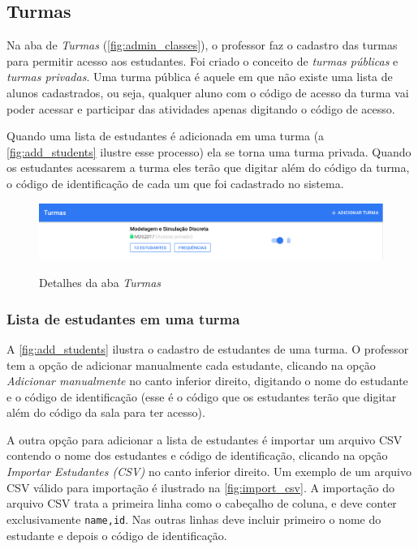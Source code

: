 \subsection{Turmas}
\label{subsection:turmas}

Na aba de \textit{Turmas} (\autoref{fig:admin_classes}), o professor faz o cadastro das turmas
para permitir acesso aos estudantes. Foi criado o conceito de \textit{turmas públicas}
e \textit{turmas privadas}. Uma turma pública é aquele em que não existe uma
lista de alunos cadastrados, ou seja, qualquer aluno com o código de acesso da turma
vai poder acessar e participar das atividades apenas digitando o código de acesso.

Quando uma lista de estudantes é adicionada em uma turma (a \autoref{fig:add_students} ilustre esse processo) ela se
torna uma turma privada. Quando os estudantes acessarem a turma eles terão que
digitar além do código da turma, o código de identificação de cada um que foi cadastrado no sistema.

\begin{figure}[ht]
  \centering
  \caption{Detalhes da aba \textit{Turmas}}
  \includegraphics[scale=.42]{imagens/telas/admin_classes}
  \doautor
  \label{fig:admin_classes}
\end{figure}

\subsubsection{Lista de estudantes em uma turma}

A \autoref{fig:add_students} ilustra o cadastro de estudantes de uma turma.
O professor tem a opção de adicionar manualmente cada estudante, clicando
na opção \textit{Adicionar manualmente} no canto inferior direito, digitando
o nome do estudante e o código de identificação (esse é o código que os estudantes
terão que digitar além do código da sala para ter acesso).

A outra opção para adicionar a lista de estudantes é importar um arquivo CSV
contendo o nome dos estudantes e código de identificação, clicando
na opção \textit{Importar Estudantes (CSV)} no canto inferior direito. Um exemplo de um
arquivo CSV válido para importação é ilustrado na \autoref{fig:import_csv}.
A importação do arquivo CSV trata a primeira linha como o cabeçalho de coluna,
e deve conter exclusivamente \texttt{name,id}. Nas outras linhas deve incluir
primeiro o nome do estudante e depois o código de identificação.


